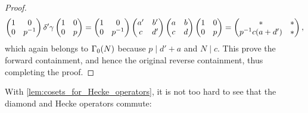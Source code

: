 \begin{proof}
\[        \begin{pmatrix} 1 & 0 \\ 0 & p^{-1} \end{pmatrix}\delta'\gamma\begin{pmatrix} 1 & 0 \\ 0 & p \end{pmatrix} = \begin{pmatrix} 1 & 0 \\ 0 & p^{-1} \end{pmatrix}\begin{pmatrix} a' & b' \\ c & d' \end{pmatrix}\begin{pmatrix} a & b \\ c & d \end{pmatrix}\begin{pmatrix} 1 & 0 \\ 0 & p \end{pmatrix} = \begin{pmatrix} \ast & \ast \\ p^{-1}c(a+d') & \ast \end{pmatrix},
      \]
      which again belongs to $\Gamma_{0}(N)$ because $p \mid d'+a$ and $N \mid c$. This prove the forward containment, and hence the original reverse containment, thus completing the proof.
    \end{proof}
    
    With \cref{lem:cosets_for_Hecke_operators}, it is not too hard to see that the diamond and Hecke operators commute:

